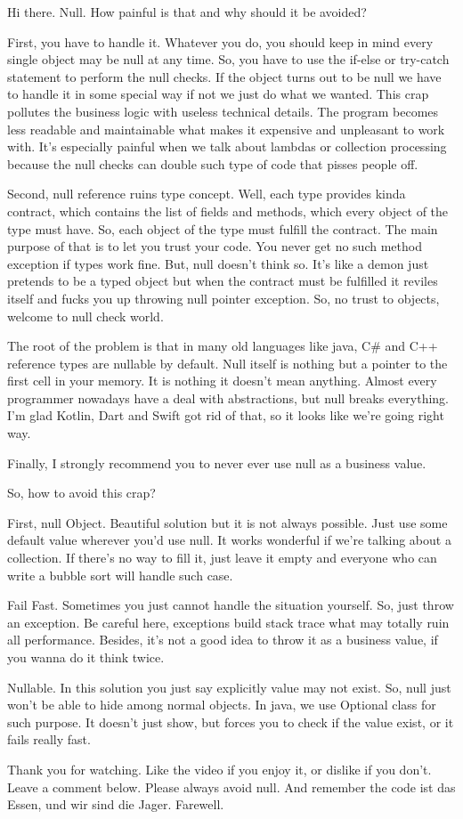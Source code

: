 \documentclass[oneside,final,14pt]{extreport}
\begin{document}
    Hi there.
    Null.
    How painful is that and why should it be avoided?

    First, you have to handle it.
    Whatever you do, you should keep in mind every single object may be null at any time.
    So, you have to use the if-else or try-catch statement to perform the null checks.
    If the object turns out to be null we have to handle it in some special way if not we just do what we wanted.
    This crap pollutes the business logic with useless technical details.
    The program becomes less readable and maintainable what makes it expensive and unpleasant to work with.
    It's especially painful when we talk about lambdas or collection processing because the null checks can double such type of code that pisses people off.

    Second, null reference ruins type concept.
    Well, each type provides kinda contract, which contains the list of fields and methods, which every object of the type must have.
    So, each object of the type must fulfill the contract.
    The main purpose of that is to let you trust your code.
    You never get no such method exception if types work fine.
    But, null doesn't think so.
    It's like a demon just pretends to be a typed object but when the contract must be fulfilled it reviles itself and fucks you up throwing null pointer exception.
    So, no trust to objects, welcome to null check world.

    The root of the problem is that in many old languages like java, C\# and C++ reference types are nullable by default.
    Null itself is nothing but a pointer to the first cell in your memory.
    It is nothing it doesn't mean anything.
    Almost every programmer nowadays have a deal with abstractions, but null breaks everything.
    I'm glad Kotlin, Dart and Swift got rid of that, so it looks like we're going right way.

    Finally, I strongly recommend you to never ever use null as a business value.

    So, how to avoid this crap?

    First, null Object.
    Beautiful solution but it is not always possible.
    Just use some default value wherever you'd use null.
    It works wonderful if we're talking about a collection.
    If there's no way to fill it, just leave it empty and everyone who can write a bubble sort will handle such case.

    Fail Fast.
    Sometimes you just cannot handle the situation yourself.
    So, just throw an exception.
    Be careful here, exceptions build stack trace what may totally ruin all performance.
    Besides, it's not a good idea to throw it as a business value, if you wanna do it think twice.

    Nullable.
    In this solution you just say explicitly value may not exist.
    So, null just won't be able to hide among normal objects.
    In java, we use Optional class for such purpose.
    It doesn't just show, but forces you to check if the value exist, or it fails really fast.

    Thank you for watching.
    Like the video if you enjoy it, or dislike if you don't.
    Leave a comment below.
    Please always avoid null.
    And remember the code ist das Essen, und wir sind die Jager.
    Farewell.
\end{document}
